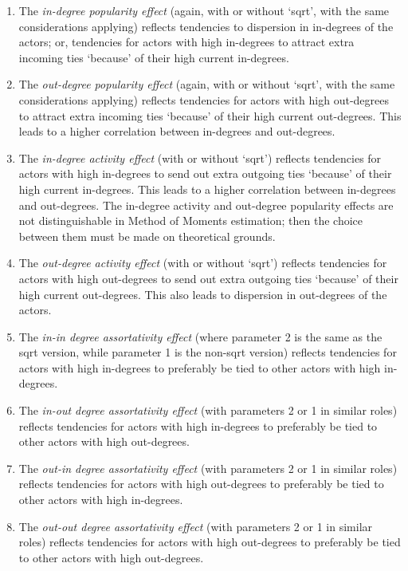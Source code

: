 \documentclass[a4paper,fleqn,11pt]{article}
\newcommand{\+}{\, + \,}
\begin{document}
{\begin{enumerate}
\item The \emph{in-degree popularity effect} (again, with or without `sqrt',
     with the same considerations applying)
     reflects tendencies to dispersion in in-degrees of the actors;
     or, tendencies for actors with high in-degrees to attract extra incoming ties
     `because' of their high current in-degrees.
\item The \emph{out-degree popularity effect} (again, with or without `sqrt',
     with the same considerations applying)
     reflects tendencies for
     actors with high out-degrees to attract extra incoming ties
     `because' of their high current out-degrees.
     This leads to a higher correlation between in-degrees and out-degrees.
\item The \emph{in-degree activity effect} (with or without `sqrt')
     reflects tendencies for
     actors with high in-degrees to send out extra outgoing ties
     `because' of their high current in-degrees.
     This leads to a higher correlation between in-degrees and out-degrees.
     The in-degree activity and out-degree popularity effects are
     not distinguishable in Method of Moments estimation; then the choice between them
     must be made on theoretical grounds.
\item The \emph{out-degree activity effect} (with or without `sqrt')
     reflects tendencies for
     actors with high out-degrees to send out extra outgoing ties
     `because' of their high current out-degrees.
     This also leads to dispersion in out-degrees of the actors.
\item The \emph{in-in degree assortativity effect} (where parameter 2 is the same
    as the sqrt version, while parameter 1 is the non-sqrt version)
     reflects tendencies for actors with high in-degrees
     to preferably be tied to other actors with high in-degrees.
\item The \emph{in-out degree assortativity effect} (with parameters
     2 or 1 in similar roles)
     reflects tendencies for actors with high in-degrees
     to preferably be tied to other actors with high out-degrees.
\item The \emph{out-in degree assortativity effect} (with parameters
     2 or 1 in similar roles)
     reflects tendencies for actors with high out-degrees
     to preferably be tied to other actors with high in-degrees.
\item The \emph{out-out degree assortativity effect} (with parameters
     2 or 1 in similar roles)
     reflects tendencies for actors with high out-degrees
     to preferably be tied to other actors with high out-degrees.
\end{enumerate}

}
\end{document}
